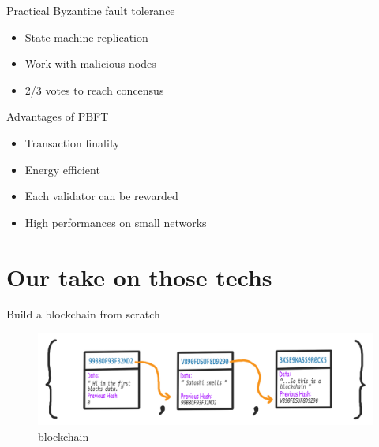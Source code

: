 \documentclass[12pt]{beamer}
\begin{document}
  \begin{frame}{Practical Byzantine fault tolerance}
    \begin{itemize}
      \item State machine replication
      \pause
      \item Work with malicious nodes
      \pause
      \item 2/3 votes to reach concensus
    \end{itemize}
  \end{frame}

  \begin{frame}{Advantages of PBFT}
    \begin{itemize}
      \item Transaction finality
      \pause
      \item Energy efficient
      \pause
      \item Each validator can be rewarded
      \pause
      \item High performances on small networks
    \end{itemize}
  \end{frame}

  \section{Our take on those techs}

  \begin{frame}{Build a blockchain from scratch}
    \begin{figure}
      \includegraphics[height=.35\textheight]{images/scratch}
      \caption{blockchain}
    \end{figure}
  \end{frame}
\end{document}
